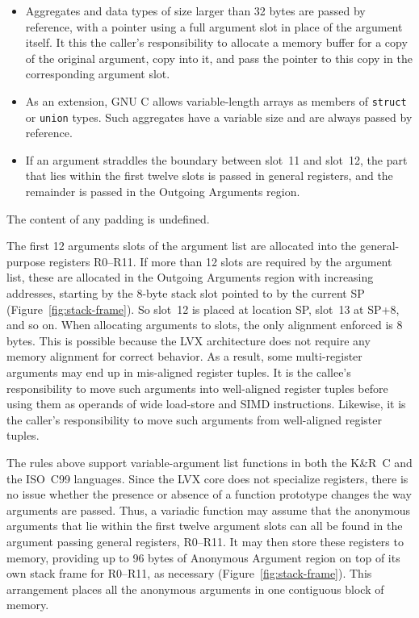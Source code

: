 \begin{itemize}
\item Aggregates and data types of size larger than 32 bytes are passed by
    reference, with a pointer using a full argument slot in place of the
    argument itself. It this the caller's responsibility to allocate a memory
    buffer for a copy of the original argument, copy into it, and pass the
    pointer to this copy in the corresponding argument slot.

\item As an extension, GNU C allows variable-length arrays as members of
    \verb|struct| or \verb|union| types. Such aggregates have a variable size
    and are always passed by reference.

\item If an argument straddles the boundary between slot~11 and slot~12, the
    part that lies within the first twelve slots is passed in general registers,
    and the remainder is passed in the Outgoing Arguments region.

\end{itemize} The content of any padding is undefined.

The first 12 arguments slots of the argument list are allocated into the
general-purpose registers R0--R11. If more than 12 slots are required by the
argument list, these are allocated in the Outgoing Arguments region with
increasing addresses, starting by the 8-byte stack slot pointed to by the
current SP (Figure~\ref{fig:stack-frame}). So slot~12 is placed at location SP,
slot~13 at SP+8, and so on.  When allocating arguments to slots, the only
alignment enforced is 8 bytes.  This is possible because the LVX
architecture does not require any memory alignment for correct behavior. As a
result, some multi-register arguments may end up in mis-aligned register
tuples. It is the callee's responsibility to move such arguments into
well-aligned register tuples before using them as operands of wide load-store
and SIMD instructions. Likewise, it is the caller's responsibility to move such
arguments from well-aligned register tuples.

The rules above support variable-argument list functions in both the K\&R~C and
the ISO~C99 languages. Since the LVX core does not specialize registers,
there is no issue whether the presence or absence of a function prototype
changes the way arguments are passed.  Thus, a variadic function may assume that
the anonymous arguments that lie within the first twelve argument slots can all
be found in the argument passing general registers, R0--R11. It may then store
these registers to memory, providing up to 96 bytes of Anonymous Argument region
on top of its own stack frame for R0--R11, as necessary
(Figure~\ref{fig:stack-frame}). This arrangement places all the anonymous
arguments in one contiguous block of memory.

